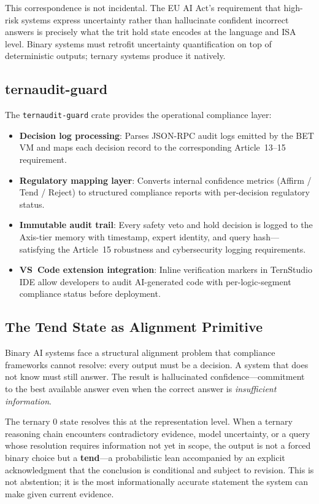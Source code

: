 \documentclass[journal,10pt,twocolumn]{IEEEtran}
\begin{document}
This correspondence is not incidental. The EU AI Act's requirement that
high-risk systems express uncertainty rather than hallucinate confident
incorrect answers is precisely what the trit hold state encodes at the
language and ISA level. Binary systems must retrofit uncertainty
quantification on top of deterministic outputs; ternary systems produce
it natively.

\subsection{ternaudit-guard}

The \texttt{ternaudit-guard} crate provides the operational compliance layer:

\begin{itemize}
  \item \textbf{Decision log processing}: Parses JSON-RPC audit logs emitted
        by the BET VM and maps each decision record to the corresponding
        Article~13--15 requirement.
  \item \textbf{Regulatory mapping layer}: Converts internal confidence
        metrics (Affirm / Tend / Reject) to structured compliance reports
        with per-decision regulatory status.
  \item \textbf{Immutable audit trail}: Every safety veto and hold decision
        is logged to the Axis-tier memory with timestamp, expert identity,
        and query hash---satisfying the Article~15 robustness and
        cybersecurity logging requirements.
  \item \textbf{VS~Code extension integration}: Inline verification markers
        in TernStudio IDE allow developers to audit AI-generated code with
        per-logic-segment compliance status before deployment.
\end{itemize}

\subsection{The Tend State as Alignment Primitive}
\label{subsec:tend_state}

Binary AI systems face a structural alignment problem that compliance
frameworks cannot resolve: every output must be a decision. A system that
does not know must still answer. The result is hallucinated
confidence---commitment to the best available answer even when the correct
answer is \emph{insufficient information}.

The ternary $0$ state resolves this at the representation level. When a
ternary reasoning chain encounters contradictory evidence, model uncertainty,
or a query whose resolution requires information not yet in scope, the output
is not a forced binary choice but a \textbf{tend}---a probabilistic lean
accompanied by an explicit acknowledgment that the conclusion is conditional
and subject to revision. This is not abstention; it is the most
informationally accurate statement the system can make given current evidence.
\end{document}
